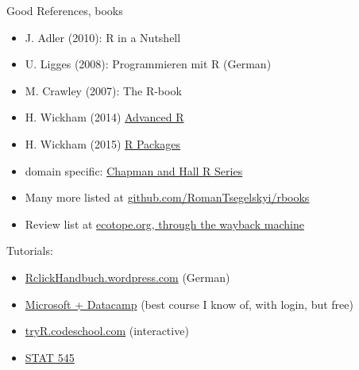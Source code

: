 \documentclass[xcolor=table,           xcolor=dvipsnames]{beamer}\usepackage[]{graphicx}\usepackage[]{color}
\newcommand{\datalink}[1]{\href{https://dl.dropboxusercontent.com/u/4836866/R_course_Berry/data/#1?dl=1}{#1}}
\begin{document}


\begin{frame}[fragile]{Good References, books }%
\begin{itemize}[<+->]
\item J. Adler (2010): R in a Nutshell
\item U. Ligges (2008): Programmieren mit R (German)
\item M. Crawley (2007): The R-book
\item H. Wickham (2014) \href{http://adv-r.had.co.nz}{Advanced R}
\item H. Wickham (2015) \href{http://r-pkgs.had.co.nz}{R Packages}
\item domain specific: \href{http://www.crcpress.com/browse/series/crctherser}{Chapman and Hall R Series}
\item Many more listed at \href{https://github.com/RomanTsegelskyi/rbooks}{github.com/RomanTsegelskyi/rbooks}
\item Review list at \href{https://web.archive.org/web/20130619094650/http://ecotope.org/blogs/page/R-Book-Review.aspx}{ecotope.org, through the wayback machine}
\end{itemize}
\onslide<+-> Tutorials:
\begin{itemize}[<+->]
\item \href{http://RclickHandbuch.wordpress.com}{RclickHandbuch.wordpress.com} (German)
\item \href{https://www.edx.org/course/introduction-r-programming-microsoft-dat204x-0#!}{Microsoft + Datacamp} (best course I know of, with login, but free)
\item \href{http://tryr.codeschool.com/levels/1/challenges/1}{tryR.codeschool.com} (interactive)
\item \href{http://stat545-ubc.github.io/topics.html}{STAT 545}
\end{itemize}
\label{books}
\end{frame}
\end{document}
